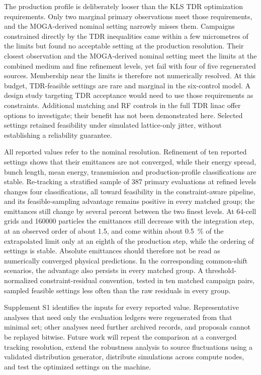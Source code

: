 \documentclass[aps,prab,reprint,superscriptaddress,amsmath,amssymb,floatfix]{revtex4-2}
\begin{document}
The production profile is deliberately looser than the KLS TDR optimization requirements. Only
two marginal primary observations meet those requirements, and the MOGA-derived nominal setting
narrowly misses them. Campaigns constrained directly by the TDR inequalities came within a few
micrometres of the limits but found no acceptable setting at the production resolution. Their
closest observation and the MOGA-derived nominal setting meet the limits at the combined medium
and fine refinement levels, yet fail with four of five regenerated sources. Membership near the
limits is therefore not numerically resolved. At this budget, TDR-feasible settings are rare and
marginal in the six-control model. A design study targeting TDR acceptance would need to use
those requirements as constraints. Additional matching and RF controls in the full TDR linac
offer options to investigate; their benefit has not been demonstrated here. Selected settings
retained feasibility under simulated lattice-only jitter, without establishing a reliability
guarantee.

All reported values refer to the nominal resolution. Refinement of ten reported settings shows
that their emittances are not converged, while their energy spread, bunch length, mean energy,
transmission and production-profile classifications are stable. Re-tracking a stratified sample
of 387 primary evaluations at refined levels changes four classifications, all toward
feasibility in the constraint-aware pipeline, and its feasible-sampling advantage remains
positive in every matched group; the emittances still change by several percent between the two
finest levels. At 64-cell grids and \num{160000} particles the emittances still decrease with
the integration step, at an observed order of about 1.5, and come within about
\SI{0.5}{\percent} of the extrapolated limit only at an eighth of the production step, while the
ordering of settings is stable. Absolute emittances should therefore not be read as numerically converged
physical predictions. In the corresponding common-shift scenarios, the advantage also persists
in every matched group. A threshold-normalized constraint-residual convention, tested in ten
matched campaign pairs, sampled feasible settings less often than the raw residuals in every
group.

Supplement S1 identifies the inputs for every reported value. Representative analyses that need
only the evaluation ledgers were regenerated from that minimal set; other analyses need further
archived records, and proposals cannot be replayed bitwise. Future work will repeat the
comparison at a converged tracking resolution, extend the robustness analysis to source
fluctuations using a validated distribution generator, distribute simulations across compute
nodes, and test the optimized settings on the machine.
\end{document}
